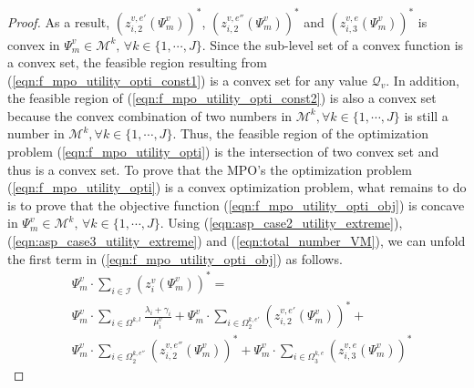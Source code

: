\documentclass[10pt,journal, compsoc]{IEEEtran}
\begin{document}
\begin{proof}
    As a result, $(z_{i,2}^{v, e'}(\Psi_m^v))^*$, $(z_{i,2}^{v, e''}(\Psi_m^v))^*$ and $(z_{i,3}^{v, e}(\Psi_m^v))^*$ is convex in $\Psi_m^v \in \mathcal{M}^k,\, \forall k \in \{1,\cdots, J\}$. Since the sub-level set of a convex function is a convex set, the feasible region resulting from (\ref{eqn:f_mpo_utility_opti_const1}) is a convex set for any value $\mathcal{Q}_v$. In addition, the feasible region of (\ref{eqn:f_mpo_utility_opti_const2}) is also a convex set because the convex combination of two numbers in $\mathcal{M}^k, \forall k \in \{1, \cdots, J\}$ is still a number in $\mathcal{M}^k, \forall k \in \{1, \cdots, J\}$. Thus, the feasible region of the optimization problem (\ref{eqn:f_mpo_utility_opti}) is the intersection of two convex set and thus is a convex set. To prove that the MPO's the optimization problem (\ref{eqn:f_mpo_utility_opti}) is a convex optimization problem, what remains to do is to prove that the objective function (\ref{eqn:f_mpo_utility_opti_obj}) is concave in $\Psi_m^v \in \mathcal{M}^k,\, \forall k \in \{1,\cdots, J\}$. Using (\ref{eqn:asp_case2_utility_extreme}), (\ref{eqn:asp_case3_utility_extreme}) and (\ref{eqn:total_number_VM}), we can unfold the first term in (\ref{eqn:f_mpo_utility_opti_obj}) as follows.
    \begin{equation}\label{eqn:mpo_utility_first_term}
    \begin{aligned}
    &\Psi_m^v \cdot \sum_{i \in \mathcal{I}} (z_{i}^v(\Psi_m^v))^* = \\
    &\Psi_m^v \cdot \sum_{i\in \Omega^{k,l}}\frac{\lambda_i + \gamma_i}{\mu_i^v}+
    \Psi_m^v \cdot \sum_{i\in \Omega^{k,e'}_{2}}(z_{i,2}^{v,e'}(\Psi_m^v))^* + \\
    &\Psi_m^v \cdot \sum_{i\in \Omega^{k,e''}_{2}}(z_{i,2}^{v,e''}(\Psi_m^v))^* + \Psi_m^v \cdot \sum_{i\in \Omega^{k,e}_{3}}(z_{i,3}^{v,e}(\Psi_m^v))^*
    \end{aligned}   
    \end{equation} 
    

\end{proof}
\end{document}
